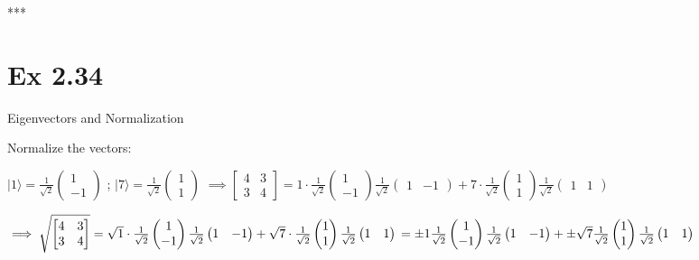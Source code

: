 \documentclass{article}
\newcommand{\0}{{$|0\rangle$}}
\newcommand{\1}{{$|1\rangle$}}
\begin{document}
***
\newpage
\section*{Ex 2.34}
Eigenvectors and Normalization  

Normalize the vectors:

$|1\rangle = \frac{1}{\sqrt{2}}\begin{pmatrix} 1 \\ -1 \end{pmatrix}$ ; $|7\rangle = \frac{1}{\sqrt{2}}\begin{pmatrix} 1 \\ 1 \end{pmatrix}$  
$\implies \begin{bmatrix} 4 & 3 \\ 3 & 4 \end{bmatrix} = 1 \cdot \frac{1}{\sqrt{2}}\begin{pmatrix} 1 \\ -1 \end{pmatrix} \frac{1}{\sqrt{2}}\begin{pmatrix} 1 & -1 \end{pmatrix} + 7 \cdot \frac{1}{\sqrt{2}}\begin{pmatrix} 1 \\ 1 \end{pmatrix} \frac{1}{\sqrt{2}} \begin{pmatrix} 1 & 1 \end{pmatrix}$  

$\implies \sqrt{\begin{bmatrix} 4 & 3 \\ 3 & 4 \end{bmatrix}} = \sqrt{1} \cdot \frac{1}{\sqrt{2}}\begin{pmatrix} 1 \\ -1 \end{pmatrix} \frac{1}{\sqrt{2}}\begin{pmatrix} 1 & -1 \end{pmatrix} + \sqrt{7} \cdot \frac{1}{\sqrt{2}}\begin{pmatrix} 1 \\ 1 \end{pmatrix} \frac{1}{\sqrt{2}}\begin{pmatrix} 1 & 1 \end{pmatrix} \\
= \pm 1 \frac{1}{\sqrt{2}}\begin{pmatrix} 1 \\ -1 \end{pmatrix} \frac{1}{\sqrt{2}}\begin{pmatrix} 1 & -1 \end{pmatrix} + \pm \sqrt{7} \frac{1}{\sqrt{2}} \begin{pmatrix} 1 \\ 1 \end{pmatrix} \frac{1}{\sqrt{2}}\begin{pmatrix} 1 & 1 \end{pmatrix}$
\end{document}
